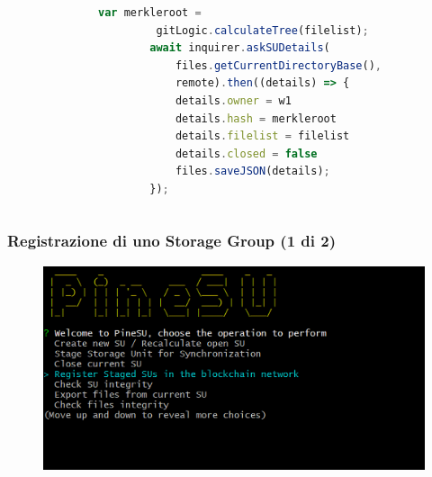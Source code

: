 \documentclass{beamer}
\begin{document}
\begin{frame}[fragile]
\begin{columns}
\begin{figure}
			\bigskip
		\end{figure}
		\begin{lstlisting}[language=JavaScript, numbers=none]
		var merkleroot =
		 gitLogic.calculateTree(filelist);
		await inquirer.askSUDetails(
			files.getCurrentDirectoryBase(),
			remote).then((details) => {
			details.owner = w1
			details.hash = merkleroot
			details.filelist = filelist
			details.closed = false
			files.saveJSON(details);
		});
		\end{lstlisting}
	\end{columns}
\end{frame}

\begin{frame}
	\frametitle{Registrazione di uno Storage Group (1 di 2)}
	\begin{figure}
		\includegraphics[width=\textwidth]{figures/ops/4.png}
	\end{figure}
\end{frame}
\end{document}

